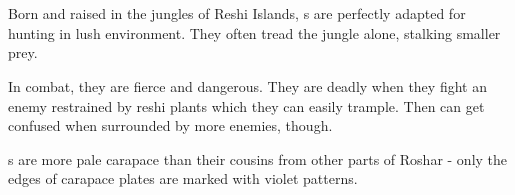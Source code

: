 \section{\enemyWhitespineName{}}
\label{enemyWhitespine}

Born and raised in the jungles of Reshi Islands, \enemyWhitespine{}s are perfectly adapted for hunting in lush environment. They often tread the jungle alone, stalking smaller prey.

In combat, they are fierce and dangerous. They are deadly when they fight an enemy restrained by reshi plants which they can easily trample. Then can get confused when surrounded by more enemies, though.

\enemyWhitespine{}s are more pale carapace than their cousins from other parts of Roshar - only the edges of carapace plates are marked with violet patterns. 
\\



